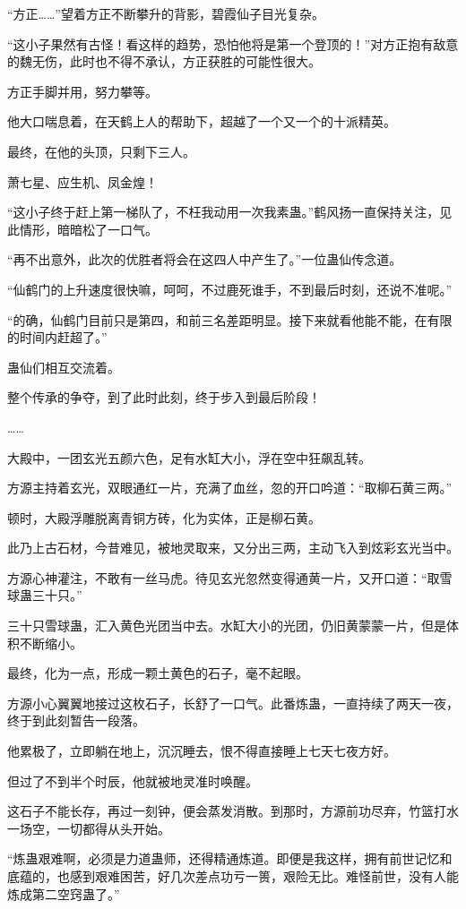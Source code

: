 \begin{this_body}
“方正……”望着方正不断攀升的背影，碧霞仙子目光复杂。

“这小子果然有古怪！看这样的趋势，恐怕他将是第一个登顶的！”对方正抱有敌意的魏无伤，此时也不得不承认，方正获胜的可能性很大。

方正手脚并用，努力攀等。

他大口喘息着，在天鹤上人的帮助下，超越了一个又一个的十派精英。

最终，在他的头顶，只剩下三人。

萧七星、应生机、凤金煌！

“这小子终于赶上第一梯队了，不枉我动用一次我素蛊。”鹤风扬一直保持关注，见此情形，暗暗松了一口气。

“再不出意外，此次的优胜者将会在这四人中产生了。”一位蛊仙传念道。

“仙鹤门的上升速度很快嘛，呵呵，不过鹿死谁手，不到最后时刻，还说不准呢。”

“的确，仙鹤门目前只是第四，和前三名差距明显。接下来就看他能不能，在有限的时间内赶超了。”

蛊仙们相互交流着。

整个传承的争夺，到了此时此刻，终于步入到最后阶段！

……

大殿中，一团玄光五颜六色，足有水缸大小，浮在空中狂飙乱转。

方源主持着玄光，双眼通红一片，充满了血丝，忽的开口吟道：“取柳石黄三两。”

顿时，大殿浮雕脱离青铜方砖，化为实体，正是柳石黄。

此乃上古石材，今昔难见，被地灵取来，又分出三两，主动飞入到炫彩玄光当中。

方源心神灌注，不敢有一丝马虎。待见玄光忽然变得通黄一片，又开口道：“取雪球蛊三十只。”

三十只雪球蛊，汇入黄色光团当中去。水缸大小的光团，仍旧黄蒙蒙一片，但是体积不断缩小。

最终，化为一点，形成一颗土黄色的石子，毫不起眼。

方源小心翼翼地接过这枚石子，长舒了一口气。此番炼蛊，一直持续了两天一夜，终于到此刻暂告一段落。

他累极了，立即躺在地上，沉沉睡去，恨不得直接睡上七天七夜方好。

但过了不到半个时辰，他就被地灵准时唤醒。

这石子不能长存，再过一刻钟，便会蒸发消散。到那时，方源前功尽弃，竹篮打水一场空，一切都得从头开始。

“炼蛊艰难啊，必须是力道蛊师，还得精通炼道。即便是我这样，拥有前世记忆和底蕴的，也感到艰难困苦，好几次差点功亏一篑，艰险无比。难怪前世，没有人能炼成第二空窍蛊了。”


\end{this_body}

